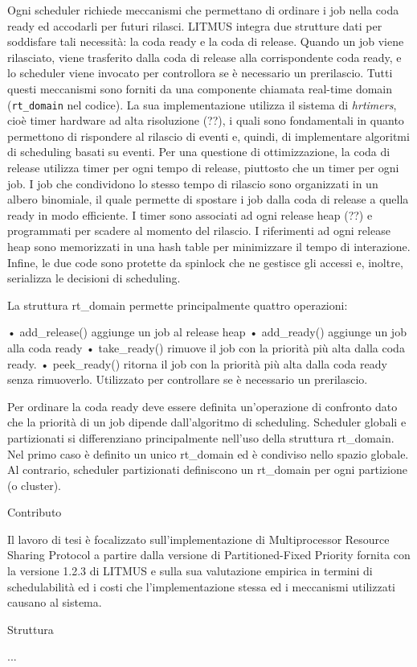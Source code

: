 Ogni scheduler richiede meccanismi che permettano di ordinare i job nella coda ready ed accodarli per futuri rilasci. LITMUS integra due strutture dati per soddisfare tali necessità: la coda ready e la coda di release. Quando un job viene rilasciato, viene trasferito dalla coda di release alla corrispondente coda ready, e lo scheduler viene invocato per controllora se è necessario un prerilascio. Tutti questi meccanismi sono forniti da una componente chiamata real-time domain (\texttt{rt_domain} nel codice). La sua implementazione utilizza il sistema di \textit{hrtimers}, cioè timer hardware ad alta risoluzione (??), i quali sono fondamentali in quanto permettono di rispondere al rilascio di eventi e, quindi, di implementare algoritmi di scheduling basati su eventi.
Per una questione di ottimizzazione, la coda di release utilizza timer per ogni tempo di release, piuttosto che un timer per ogni job. I job che condividono lo stesso tempo di rilascio sono organizzati in un albero binomiale, il quale permette di spostare i job dalla coda di release a quella ready in modo efficiente. I timer sono associati ad ogni release heap (??) e programmati per scadere al momento del rilascio. I riferimenti ad ogni release heap sono memorizzati in una hash table per minimizzare il tempo di interazione. Infine, le due code sono protette da spinlock che ne gestisce gli accessi e, inoltre, serializza le decisioni di scheduling.

La struttura rt_domain permette principalmente quattro operazioni:

• add_release() aggiunge un job al release heap
• add_ready() aggiunge un job alla coda ready
• take_ready() rimuove il job con la priorità più alta dalla coda ready. 
• peek_ready() ritorna il job con la priorità più alta dalla coda ready senza rimuoverlo. Utilizzato per controllare se è necessario un prerilascio.

Per ordinare la coda ready deve essere definita un'operazione di confronto dato che la priorità di un job dipende dall'algoritmo di scheduling.
Scheduler globali e partizionati si differenziano principalmente nell'uso della struttura rt_domain. Nel primo caso è definito un unico rt_domain ed è condiviso nello spazio globale. Al contrario, scheduler partizionati definiscono un rt_domain per ogni partizione (o cluster).

Contributo

Il lavoro di tesi è focalizzato sull'implementazione di Multiprocessor Resource Sharing Protocol a partire dalla versione di Partitioned-Fixed Priority fornita con la versione 1.2.3 di LITMUS e sulla sua valutazione empirica in termini di schedulabilità ed i costi che l'implementazione stessa ed i meccanismi utilizzati causano al sistema.

Struttura

...




